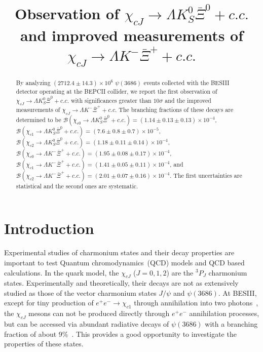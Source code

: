 \documentclass[amsmath,amssymb,twocolumn,prd,floatfix,showpacs,nofootinbib]{revtex4-1}
\begin{document}

%

\title{\boldmath Observation of $\chi_{cJ}\to \Lambda K^0_S\bar \Xi^0 + c.c.$ and improved measurements of $\chi_{cJ}\to \Lambda K^-\bar \Xi^+ + c.c.$ }


\begin{abstract}
  By analyzing $(2712.4\pm14.3)\times10^6$ $\psi(3686)$ events collected with the BESIII detector operating at the BEPCII collider, we report 
  the first observation of $\chi_{cJ}\to \Lambda K^0_S\bar \Xi^0 + c.c.$ with  significances greater than $10\sigma$ and the improved measurements of $\chi_{cJ}\to \Lambda K^-\bar \Xi^+ + c.c.$
  The branching fractions of these decays are determined to be
$\mathcal{B}(\chi_{c0}\to \Lambda K^0_S\bar \Xi^0+c.c.)=(1.14\pm0.13\pm0.13)\times10^{-4}$,
$\mathcal{B}(\chi_{c1}\to \Lambda K^0_S\bar \Xi^0+c.c.)=(7.6\pm0.8\pm0.7)\times10^{-5}$,
$\mathcal{B}(\chi_{c2}\to \Lambda K^0_S\bar \Xi^0+c.c.)=(1.18\pm0.11\pm0.14)\times10^{-4}$,
$\mathcal{B}(\chi_{c0}\to \Lambda K^-\bar \Xi^+ +c.c.)=(1.95\pm0.08\pm0.17)\times10^{-4}$,
$\mathcal{B}(\chi_{c1}\to \Lambda K^-\bar \Xi^++c.c.)=(1.41\pm0.05\pm0.11)\times10^{-4}$,
and $\mathcal{B}(\chi_{c2}\to \Lambda K^-\bar \Xi^++c.c.)=(2.01\pm0.07\pm0.16)\times10^{-4}$.
The first uncertainties are statistical and the second ones are systematic.

\end{abstract}

\maketitle

\linenumbers
\section{Introduction}
Experimental studies of charmonium states and their decay properties are important to test Quantum chromodynamics~(QCD) models and QCD based calculations. In the quark model, the $\chi_{cJ}$ ($J=0,1,2$) are the $^3P_J$ charmonium states. Experimentally and theoretically, their decays are not as extensively studied as those of the vector charmonium
states $J/\psi$ and $\psi(3686)$. At BESIII, except for tiny production of $e^+e^-\to \chi_{c1}$ through annihilation into two photons~\cite{ref::eetochic1}, the $\chi_{cJ}$ mesons can not be produced directly through $e^+ e^-$ annihilation processes, but can be accessed via abundant radiative decays of $\psi(3686)$ with a branching fraction of about 9\%~\cite{ref::pdg2024}. This provides a good opportunity to investigate the properties of these states.
\end{document}
